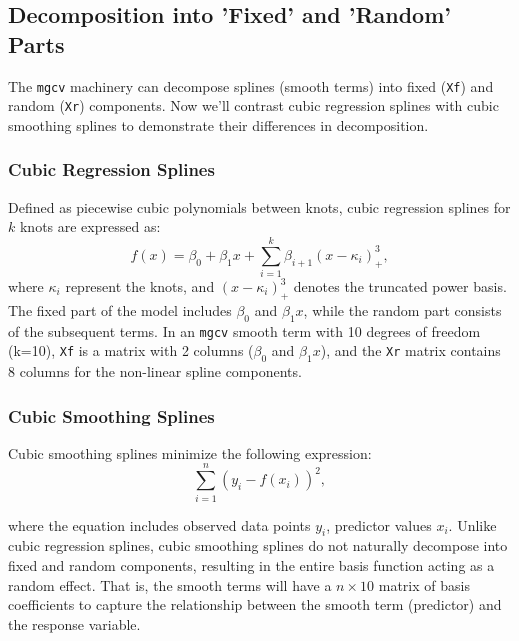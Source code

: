 \documentclass[12pt, twoside,hidelinks]{article}
\theoremstyle{definition}
\numberwithin{equation}{section}
\begin{document}
\subsection{Decomposition into 'Fixed' and 'Random' Parts}

The \texttt{mgcv} machinery can decompose splines (smooth terms) into fixed (\texttt{Xf}) and random (\texttt{Xr}) components. Now we'll contrast cubic regression splines with cubic smoothing splines to demonstrate their differences in decomposition.

\subsubsection{Cubic Regression Splines}

Defined as piecewise cubic polynomials between knots, cubic regression splines for \(k\) knots are expressed as:
\begin{equation}
    f(x) = \beta_0 + \beta_1 x + \sum_{i=1}^{k} \beta_{i+1} (x - \kappa_i)^3_+,
    \label{eq:cr_splines}
\end{equation}
where \(\kappa_i\) represent the knots, and \((x - \kappa_i)^3_+\) denotes the truncated power basis. The fixed part of the model includes \(\beta_0\) and \(\beta_1 x\), while the random part consists of the subsequent terms. In an \texttt{mgcv} smooth term with 10 degrees of freedom (k=10), \texttt{Xf} is a 
matrix with 2 columns (\(\beta_0\) and \(\beta_1 x\)), and the \texttt{Xr} matrix contains 8 columns for the non-linear spline components.

\subsubsection{Cubic Smoothing Splines}

Cubic smoothing splines minimize the following expression:
\begin{equation}
\sum_{i=1}^{n} (y_i - f(x_i))^2,
\label{eq:smoothing_splines}
\end{equation}

where the equation includes observed data points \(y_i\), predictor values \(x_i\). Unlike cubic regression splines, cubic smoothing splines do not naturally decompose into fixed and random components, resulting in the entire basis function acting as a random effect. That is, the smooth terms will have a \(n \times 10\) matrix of basis coefficients to capture the relationship between the smooth term (predictor) and the response variable. 
\end{document}

